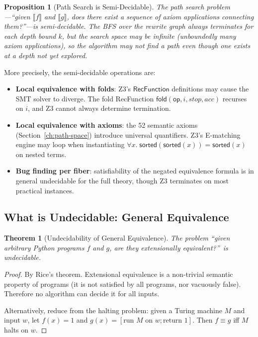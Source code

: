 \documentclass[11pt,a4paper]{report}
\theoremstyle{definition}
\theoremstyle{plain}
\newtheorem{theorem}[definition]{Theorem}
\newtheorem{proposition}[definition]{Proposition}
\newcommand{\den}[1]{\llbracket #1 \rrbracket}
\newcommand{\op}{\mathsf{op}}
\begin{document}
\begin{proposition}[Path Search is Semi-Decidable]
\label{prop:path-semi}
The path search problem---``given $\den{f}$ and $\den{g}$, does
there exist a sequence of axiom applications connecting them?''---is
semi-decidable.  The BFS over the rewrite graph always terminates for
each depth bound $k$, but the search space may be infinite
(unboundedly many axiom applications), so the algorithm may not find
a path even though one exists at a depth not yet explored.
\end{proposition}

More precisely, the semi-decidable operations are:
\begin{itemize}
  \item \textbf{Local equivalence with folds}: Z3's
    $\mathsf{RecFunction}$ definitions may cause the SMT solver to
    diverge.  The fold RecFunction
    $\mathsf{fold}(\op, i, \mathit{stop}, \mathit{acc})$ recurses on
    $i$, and Z3 cannot always determine termination.
  \item \textbf{Local equivalence with axioms}: the 52 semantic axioms
    (Section~\ref{ch:path-space}) introduce universal quantifiers.
    Z3's E-matching engine may loop when instantiating
    $\forall x.\; \mathsf{sorted}(\mathsf{sorted}(x)) = \mathsf{sorted}(x)$
    on nested terms.
  \item \textbf{Bug finding per fiber}: satisfiability of the negated
    equivalence formula is in general undecidable for the full theory,
    though Z3 terminates on most practical instances.
\end{itemize}

\subsection{What is Undecidable: General Equivalence}

\begin{theorem}[Undecidability of General Equivalence]
\label{thm:undecidable-equiv}
The problem ``given arbitrary Python programs $f$ and $g$, are they
extensionally equivalent?''\ is undecidable.
\end{theorem}

\begin{proof}
By Rice's theorem.  Extensional equivalence is a non-trivial semantic
property of programs (it is not satisfied by all programs, nor
vacuously false).  Therefore no algorithm can decide it for all inputs.

Alternatively, reduce from the halting problem: given a Turing machine
$M$ and input $w$, let $f(x) = 1$ and $g(x) = [\text{run } M
\text{ on } w; \text{return } 1]$.  Then $f \equiv g$ iff $M$ halts
on $w$.
\end{proof}
\end{document}

